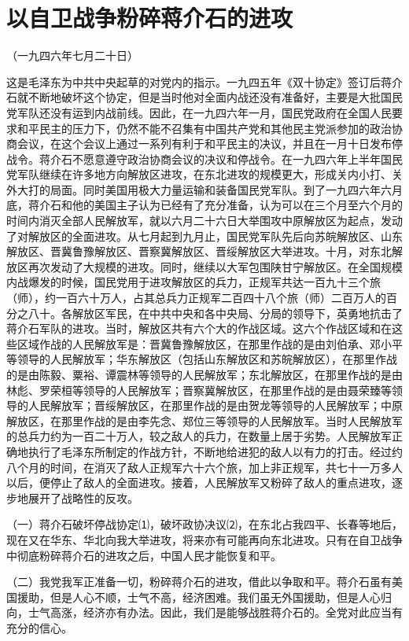 \documentclass[UTF-8, a5paper, 12pt]{ctexart}
\begin{document}
\section{以自卫战争粉碎蒋介石的进攻}


（一九四六年七月二十日）

这是毛泽东为中共中央起草的对党内的指示。一九四五年《双十协定》签订后蒋介石就不断地破坏这个协定，但是当时他对全面内战还没有准备好，主要是大批国民党军队还没有运到内战前线。因此，在一九四六年一月，国民党政府在全国人民要求和平民主的压力下，仍然不能不召集有中国共产党和其他民主党派参加的政治协商会议，在这个会议上通过一系列有利于和平民主的决议，并且在一月十日发布停战令。蒋介石不愿意遵守政治协商会议的决议和停战令。在一九四六年上半年国民党军队继续在许多地方向解放区进攻，在东北进攻的规模更大，形成关内小打、关外大打的局面。同时美国用极大力量运输和装备国民党军队。到了一九四六年六月底，蒋介石和他的美国主子认为已经有了充分准备，认为可以在三个月至六个月的时间内消灭全部人民解放军，就以六月二十六日大举围攻中原解放区为起点，发动了对解放区的全面进攻。从七月起到九月止，国民党军队先后向苏皖解放区、山东解放区、晋冀鲁豫解放区、晋察冀解放区、晋绥解放区大举进攻。十月，对东北解放区再次发动了大规模的进攻。同时，继续以大军包围陕甘宁解放区。在全国规模内战爆发的时候，国民党用于进攻解放区的兵力，正规军共达一百九十三个旅（师），约一百六十万人，占其总兵力正规军二百四十八个旅（师）二百万人的百分之八十。各解放区军民，在中共中央和各中央局、分局的领导下，英勇地抗击了蒋介石军队的进攻。当时，解放区共有六个大的作战区域。这六个作战区域和在这些区域作战的人民解放军是：晋冀鲁豫解放区，在那里作战的是由刘伯承、邓小平等领导的人民解放军；华东解放区（包括山东解放区和苏皖解放区），在那里作战的是由陈毅、粟裕、谭震林等领导的人民解放军；东北解放区，在那里作战的是由林彪、罗荣桓等领导的人民解放军；晋察冀解放区，在那里作战的是由聂荣臻等领导的人民解放军；晋绥解放区，在那里作战的是由贺龙等领导的人民解放军；中原解放区，在那里作战的是由李先念、郑位三等领导的人民解放军。当时人民解放军的总兵力约为一百二十万人，较之敌人的兵力，在数量上居于劣势。人民解放军正确地执行了毛泽东所制定的作战方针，不断地给进犯的敌人以有力的打击。经过约八个月的时间，在消灭了敌人正规军六十六个旅，加上非正规军，共七十一万多人以后，便停止了敌人的全面进攻。接着，人民解放军又粉碎了敌人的重点进攻，逐步地展开了战略性的反攻。

（一）蒋介石破坏停战协定⑴，破坏政协决议⑵，在东北占我四平、长春等地后，现在又在华东、华北向我大举进攻，将来亦有可能再向东北进攻。只有在自卫战争中彻底粉碎蒋介石的进攻之后，中国人民才能恢复和平。

（二）我党我军正准备一切，粉碎蒋介石的进攻，借此以争取和平。蒋介石虽有美国援助，但是人心不顺，士气不高，经济困难。我们虽无外国援助，但是人心归向，士气高涨，经济亦有办法。因此，我们是能够战胜蒋介石的。全党对此应当有充分的信心。
\end{document}
